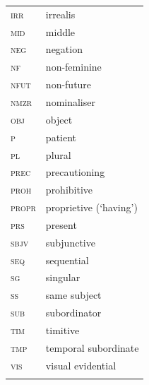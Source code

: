 \documentclass[output=paper,colorlinks,citecolor=brown]{langscibook}
\begin{document}
\begin{tabularx}{.5\textwidth}{@{}lQ@{}}
\textsc{irr} & irrealis \\
\textsc{mid} & middle \\
\textsc{neg} & negation \\
\textsc{nf} & non-feminine \\
\textsc{nfut} & non-future \\
\textsc{nmzr} & nominaliser \\
\textsc{obj} & object \\
\textsc{p} & patient \\
\textsc{pl} & plural \\
\textsc{prec} & precautioning \\
\textsc{proh} & prohibitive \\
\textsc{propr} & proprietive (`having') \\
\textsc{prs} & present \\
\textsc{sbjv} & subjunctive \\
\textsc{seq} & sequential \\
\textsc{sg} & singular \\
\textsc{ss} & same subject \\
\textsc{sub} & subordinator  \\
\textsc{tim} & timitive \\
\textsc{tmp} & temporal subordinate \\
\textsc{vis} & visual evidential \\
\\
\end{tabularx}


\sloppy
\printbibliography[heading=subbibliography,notkeyword=this]
\end{document}
